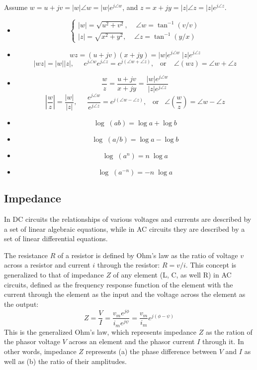Assume $w=u+jv=|w|\angle w=|w|e^{j\angle w}$, and $z=x+jy=|z|\angle z=|z|e^{j\angle z}$. 
\begin{itemize}
  \item 
    \[  \left\{ \begin{array}{l}
      |w|=\sqrt{u^2+v^2},\;\;\;\;\angle w=\tan^{-1}\left( v/v \right) \\
      |z|=\sqrt{x^2+y^2},\;\;\;\;\angle z=\tan^{-1}\left( y/x \right) \end{array} \right. \]
  \item 
    \[ w z=(u+jv)(x+jy)=|w|e^{j\angle w}\;|z|e^{j\angle z} \]
    \[ \left| wz \right| =|w||z|,\;\;\;\;\;
    e^{j\angle w} e^{j\angle z}=e^{j(\angle w+\angle z)},
    \;\;\;\mbox{or}\;\;\;\;
    \angle \left( wz \right) =\angle w+\angle z \]
  \item 
    \[ \frac{w}{z}=\frac{u+jv}{x+jy}=\frac{|w|e^{j\angle w}}{|z|e^{j\angle z}} \]
    \[ \left| \frac{w}{z} \right| =\frac{|w|}{|z|},\;\;\;\;\;
    \frac{e^{j\angle w}}{e^{j\angle z}}=e^{j(\angle w-\angle z)},\;\;\;\mbox{or}\;\;\;
    \angle \left( \frac{w}{z} \right)=\angle w-\angle z  \]
\end{itemize}

\begin{itemize}
  \item \[ \log \;(ab)=\log a+\log b \]
  \item \[ \log \;(a/b)=\log a-\log b \]
  \item \[ \log \;(a^n)=n\;\log a \]
  \item \[ \log \;(a^{-n})=-n\;\log a \]
\end{itemize}

\subsection*{Impedance}

In DC circuits the relationships of various voltages and currents are described 
by a set of linear algebraic equations, while in AC circuits they are described
by a set of linear differential equations. 

The resistance $R$ of a resistor is defined by Ohm's law as the ratio of voltage 
$v$ across a resistor and current $i$ through the resistor: $ R=v/i$.
This concept is generalized to that of impedance $Z$ of any element (L, C, as
well R) in AC circuits, defined as the frequency response function of the element
with the current through the element as the input and the voltage across the element
as the output:
\[
Z=\frac{V}{I}=\frac{v_m e^{j\phi}}{i_m e^{j\psi}}=\frac{v_m}{i_m} e^{j(\phi-\psi)} 
\]
This is the generalized Ohm's law, which represents impedance $Z$ as the ration 
of the phasor voltage $V$ across an element and the phasor current $I$ through it.
In other words, impedance $Z$ represents (a) the phase difference between $V$ and 
$I$ as well as (b) the ratio of their amplitudes.



